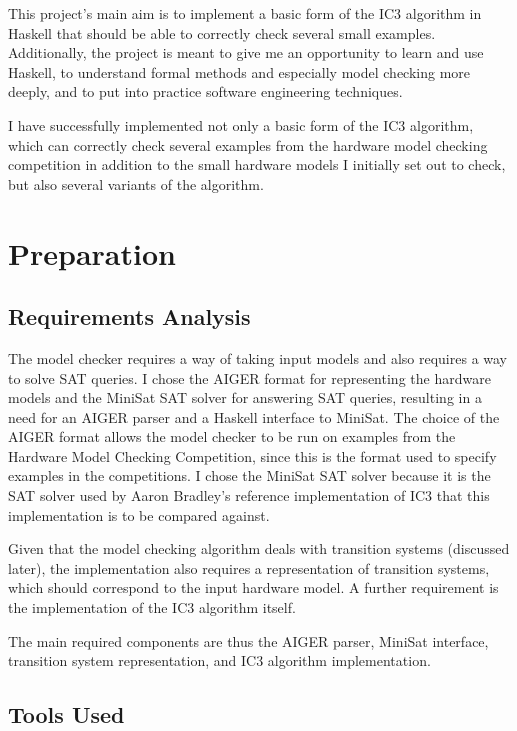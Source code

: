 \documentclass[12pt,a4paper,twoside,openright]{report}
\begin{document}
This project's main aim is to implement a basic form of the IC3 algorithm in
Haskell that should be able to correctly check several
small examples. Additionally, the project is meant to give me an opportunity
to learn and use Haskell, to understand formal methods and especially model
checking more deeply, and to put into practice software engineering techniques.

I have successfully implemented not only a basic form of the IC3 algorithm,
which can correctly check several examples from the hardware model checking
competition in addition to the small hardware models I initially set out
to check, but also several variants of the algorithm.

\chapter{Preparation}

\section{Requirements Analysis}


The model checker requires a way of taking input models and also
requires a way to solve SAT queries.
I chose the AIGER format for representing the hardware models and the
MiniSat SAT solver for answering SAT queries, resulting in a need for an
AIGER parser and a Haskell interface to MiniSat. The choice of
the AIGER format allows the model checker to be run on examples from
the Hardware Model Checking Competition, since this is the format used
to specify examples in the competitions. I chose the MiniSat SAT
solver because it is the SAT solver used by Aaron Bradley's reference
implementation of IC3 that this implementation is to be compared against.

Given that the model checking algorithm deals with transition systems
(discussed later), the implementation also requires a representation of
transition systems, which should correspond to the input hardware model.
A further requirement is the implementation of the
IC3 algorithm itself.

The main required components are thus the AIGER parser, MiniSat interface,
transition system representation, and IC3 algorithm implementation.

\section{Tools Used}
\end{document}
